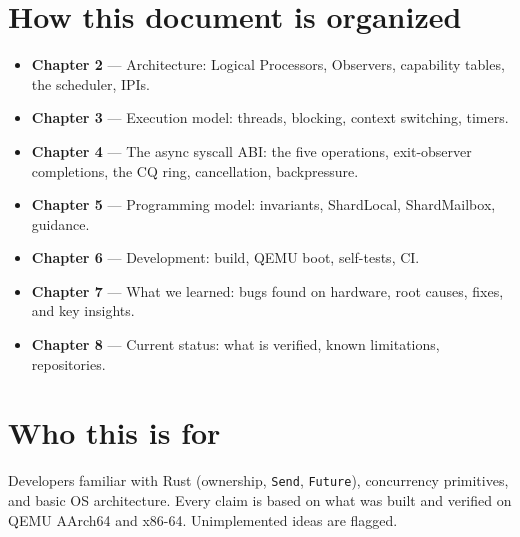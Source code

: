 \section{How this document is organized}

\begin{itemize}
    \item \textbf{Chapter 2} --- Architecture: Logical Processors, Observers,
        capability tables, the scheduler, IPIs.
    \item \textbf{Chapter 3} --- Execution model: threads, blocking, context
        switching, timers.
    \item \textbf{Chapter 4} --- The async syscall ABI: the five operations,
        exit-observer completions, the CQ ring, cancellation, backpressure.
    \item \textbf{Chapter 5} --- Programming model: invariants, ShardLocal,
        ShardMailbox, guidance.
    \item \textbf{Chapter 6} --- Development: build, QEMU boot, self-tests, CI.
    \item \textbf{Chapter 7} --- What we learned: bugs found on hardware, root
        causes, fixes, and key insights.
    \item \textbf{Chapter 8} --- Current status: what is verified, known
        limitations, repositories.
\end{itemize}

\section{Who this is for}

Developers familiar with Rust (ownership, \texttt{Send}, \texttt{Future}),
concurrency primitives, and basic OS architecture. Every claim is based on what
was built and verified on QEMU AArch64 and x86-64. Unimplemented ideas are
flagged.

\endinput

